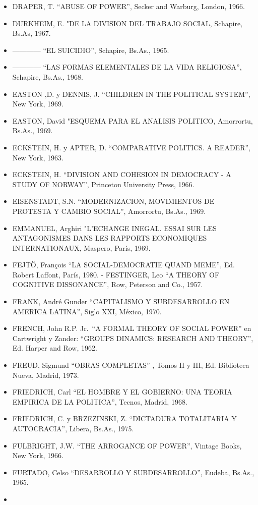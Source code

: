 \documentclass[
]{book}
\begin{document}
\begin{itemize}
\item
  DRAPER, T. ``ABUSE OF POWER'', Secker and Warburg, London, 1966.
\item
  DURKHEIM, E. "DE LA DIVISION DEL TRABAJO SOCIAL, Schapire, Bs.As, 1967.
\item
  ------------ ``EL SUICIDIO'', Schapire, Bs.As., 1965.
\item
  ------------ ``LAS FORMAS ELEMENTALES DE LA VIDA RELIGIOSA'', Schapire, Bs.As., 1968.
\item
  EASTON ,D. y DENNIS, J. ``CHILDREN IN THE POLITICAL SYSTEM'', New York, 1969.
\item
  EASTON, David "ESQUEMA PARA EL ANALISIS POLITICO, Amorrortu, Bs.As., 1969.
\item
  ECKSTEIN, H. y APTER, D. ``COMPARATIVE POLITICS. A READER'', New York, 1963.
\item
  ECKSTEIN, H. ``DIVISION AND COHESION IN DEMOCRACY - A STUDY OF NORWAY'',
  Princeton University Press, 1966.
\item
  EISENSTADT, S.N. ``MODERNIZACION, MOVIMIENTOS DE PROTESTA Y CAMBIO
  SOCIAL'', Amorrortu, Bs.As., 1969.
\item
  EMMANUEL, Arghiri "L'ECHANGE INEGAL. ESSAI SUR LES ANTAGONISMES DANS LES
  RAPPORTS ECONOMIQUES INTERNATIONAUX, Maspero, París, 1969.
\item
  FEJTÖ, François ``LA SOCIAL-DEMOCRATIE QUAND MEME'', Ed. Robert Laffont, París, 1980. - FESTINGER, Leo ``A THEORY OF COGNITIVE DISSONANCE'', Row, Peterson and Co., 1957.
\item
  FRANK, André Gunder ``CAPITALISMO Y SUBDESARROLLO EN AMERICA LATINA'', Siglo
  XXI, México, 1970.
\item
  FRENCH, John R.P. Jr.~``A FORMAL THEORY OF SOCIAL POWER'' en Cartwright y Zander:
  ``GROUPS DINAMICS: RESEARCH AND THEORY'', Ed. Harper and Row, 1962.
\item
  FREUD, Sigmund ``OBRAS COMPLETAS'' , Tomos II y III, Ed. Biblioteca Nueva, Madrid, 1973.
\item
  FRIEDRICH, Carl ``EL HOMBRE Y EL GOBIERNO: UNA TEORIA EMPIRICA DE LA
  POLITICA'', Tecnos, Madrid, 1968.
\item
  FRIEDRICH, C. y BRZEZINSKI, Z. ``DICTADURA TOTALITARIA Y AUTOCRACIA'', Libera,
  Bs.As., 1975.
\item
  FULBRIGHT, J.W. ``THE ARROGANCE OF POWER'', Vintage Books, New York, 1966.
\item
  FURTADO, Celso ``DESARROLLO Y SUBDESARROLLO'', Eudeba, Bs.As., 1965.
\item

\end{itemize}
\end{document}

